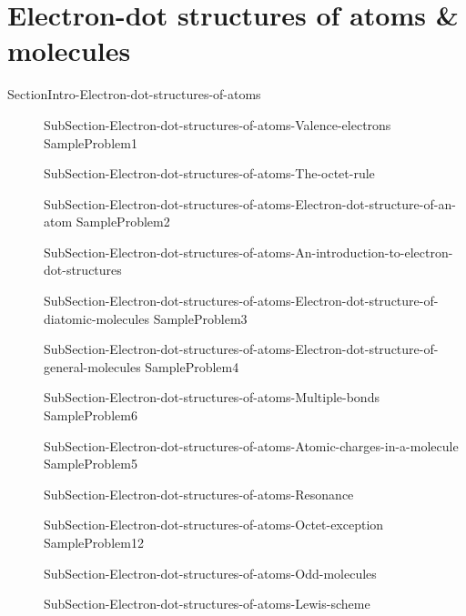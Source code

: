 \documentclass[main.tex]{subfiles}
\begin{document}
\section{Electron-dot structures of atoms \& molecules}{SectionIntro-Electron-dot-structures-of-atoms}
\sloppy\begin{description}
\item[] {SubSection-Electron-dot-structures-of-atoms-Valence-electrons}
{SampleProblem1}
\item[] {SubSection-Electron-dot-structures-of-atoms-The-octet-rule}
\item[] {SubSection-Electron-dot-structures-of-atoms-Electron-dot-structure-of-an-atom}
{SampleProblem2}
\item[] {SubSection-Electron-dot-structures-of-atoms-An-introduction-to-electron-dot-structures}

\item[] {SubSection-Electron-dot-structures-of-atoms-Electron-dot-structure-of-diatomic-molecules}
{SampleProblem3}
\item[] {SubSection-Electron-dot-structures-of-atoms-Electron-dot-structure-of-general-molecules}
{SampleProblem4}
\item[] {SubSection-Electron-dot-structures-of-atoms-Multiple-bonds}
{SampleProblem6}
\item[] {SubSection-Electron-dot-structures-of-atoms-Atomic-charges-in-a-molecule}
{SampleProblem5}
\item[] {SubSection-Electron-dot-structures-of-atoms-Resonance}
\item[] {SubSection-Electron-dot-structures-of-atoms-Octet-exception}
{SampleProblem12}
\item[] {SubSection-Electron-dot-structures-of-atoms-Odd-molecules}
\item[]{SubSection-Electron-dot-structures-of-atoms-Lewis-scheme}  

\end{description}
 
\end{document}
